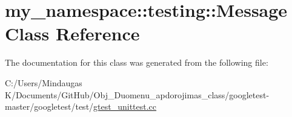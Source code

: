 \hypertarget{classmy__namespace_1_1testing_1_1_message}{}\section{my\+\_\+namespace\+::testing\+::Message Class Reference}
\label{classmy__namespace_1_1testing_1_1_message}


The documentation for this class was generated from the following file\+:\begin{DoxyCompactItemize}
\item 
C\+:/\+Users/\+Mindaugas K/\+Documents/\+Git\+Hub/\+Obj\+\_\+\+Duomenu\+\_\+apdorojimas\+\_\+class/googletest-\/master/googletest/test/\mbox{\hyperlink{googletest-master_2googletest_2test_2gtest__unittest_8cc}{gtest\+\_\+unittest.\+cc}}\end{DoxyCompactItemize}
